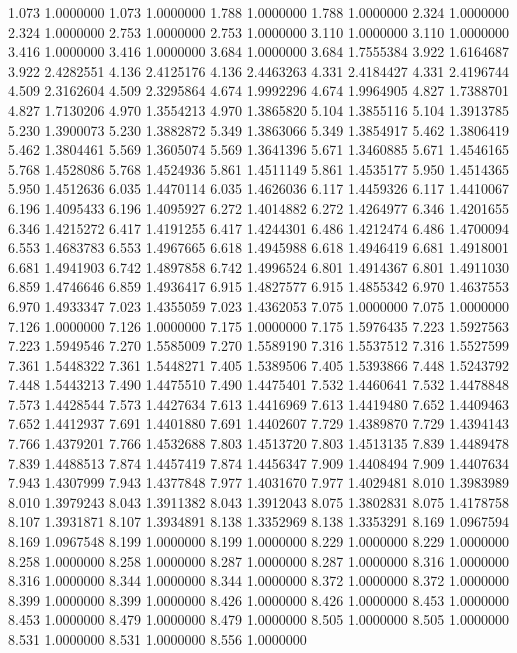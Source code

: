 1.073 1.0000000
1.073 1.0000000
1.788 1.0000000
1.788 1.0000000
2.324 1.0000000
2.324 1.0000000
2.753 1.0000000
2.753 1.0000000
3.110 1.0000000
3.110 1.0000000
3.416 1.0000000
3.416 1.0000000
3.684 1.0000000
3.684 1.7555384
3.922 1.6164687
3.922 2.4282551
4.136 2.4125176
4.136 2.4463263
4.331 2.4184427
4.331 2.4196744
4.509 2.3162604
4.509 2.3295864
4.674 1.9992296
4.674 1.9964905
4.827 1.7388701
4.827 1.7130206
4.970 1.3554213
4.970 1.3865820
5.104 1.3855116
5.104 1.3913785
5.230 1.3900073
5.230 1.3882872
5.349 1.3863066
5.349 1.3854917
5.462 1.3806419
5.462 1.3804461
5.569 1.3605074
5.569 1.3641396
5.671 1.3460885
5.671 1.4546165
5.768 1.4528086
5.768 1.4524936
5.861 1.4511149
5.861 1.4535177
5.950 1.4514365
5.950 1.4512636
6.035 1.4470114
6.035 1.4626036
6.117 1.4459326
6.117 1.4410067
6.196 1.4095433
6.196 1.4095927
6.272 1.4014882
6.272 1.4264977
6.346 1.4201655
6.346 1.4215272
6.417 1.4191255
6.417 1.4244301
6.486 1.4212474
6.486 1.4700094
6.553 1.4683783
6.553 1.4967665
6.618 1.4945988
6.618 1.4946419
6.681 1.4918001
6.681 1.4941903
6.742 1.4897858
6.742 1.4996524
6.801 1.4914367
6.801 1.4911030
6.859 1.4746646
6.859 1.4936417
6.915 1.4827577
6.915 1.4855342
6.970 1.4637553
6.970 1.4933347
7.023 1.4355059
7.023 1.4362053
7.075 1.0000000
7.075 1.0000000
7.126 1.0000000
7.126 1.0000000
7.175 1.0000000
7.175 1.5976435
7.223 1.5927563
7.223 1.5949546
7.270 1.5585009
7.270 1.5589190
7.316 1.5537512
7.316 1.5527599
7.361 1.5448322
7.361 1.5448271
7.405 1.5389506
7.405 1.5393866
7.448 1.5243792
7.448 1.5443213
7.490 1.4475510
7.490 1.4475401
7.532 1.4460641
7.532 1.4478848
7.573 1.4428544
7.573 1.4427634
7.613 1.4416969
7.613 1.4419480
7.652 1.4409463
7.652 1.4412937
7.691 1.4401880
7.691 1.4402607
7.729 1.4389870
7.729 1.4394143
7.766 1.4379201
7.766 1.4532688
7.803 1.4513720
7.803 1.4513135
7.839 1.4489478
7.839 1.4488513
7.874 1.4457419
7.874 1.4456347
7.909 1.4408494
7.909 1.4407634
7.943 1.4307999
7.943 1.4377848
7.977 1.4031670
7.977 1.4029481
8.010 1.3983989
8.010 1.3979243
8.043 1.3911382
8.043 1.3912043
8.075 1.3802831
8.075 1.4178758
8.107 1.3931871
8.107 1.3934891
8.138 1.3352969
8.138 1.3353291
8.169 1.0967594
8.169 1.0967548
8.199 1.0000000
8.199 1.0000000
8.229 1.0000000
8.229 1.0000000
8.258 1.0000000
8.258 1.0000000
8.287 1.0000000
8.287 1.0000000
8.316 1.0000000
8.316 1.0000000
8.344 1.0000000
8.344 1.0000000
8.372 1.0000000
8.372 1.0000000
8.399 1.0000000
8.399 1.0000000
8.426 1.0000000
8.426 1.0000000
8.453 1.0000000
8.453 1.0000000
8.479 1.0000000
8.479 1.0000000
8.505 1.0000000
8.505 1.0000000
8.531 1.0000000
8.531 1.0000000
8.556 1.0000000
